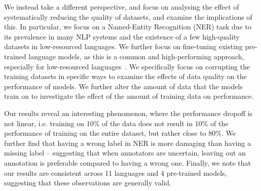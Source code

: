 \documentclass{article}
\begin{document}


We instead take a different perspective, and focus on analysing the effect of systematically reducing the quality of datasets, and examine the implications of this. In particular, we focus on a Named-Entity Recognition (NER) task due to its prevalence in many NLP systems and the existence of a few high-quality datasets in low-resourced languages. We further focus on fine-tuning existing pre-trained language models, as this is a common and high-performing approach, especially for low-resourced languages~\citep{ogueji2021Small,adelani2021MasakhaNER,alabi2022Multilingual}. We specifically focus on corrupting the training datasets in specific ways to examine the effects of data quality on the performance of models. We further alter the amount of data that the models train on to investigate the effect of the amount of training data on performance.


Our results reveal an interesting  phenomenon, where the performance dropoff is not linear, i.e. training on 10\% of the data does not result in 10\% of the performance of training on the entire dataset, but rather close to 80\%. We further find that having a wrong label in NER is more damaging than having a missing label -- suggesting that when annotators are uncertain, leaving out an annotation is preferable compared to having a wrong one. Finally, we note that our results are consistent across 11 languages and 4 pre-trained models, suggesting that these observations are generally valid.
\end{document}
